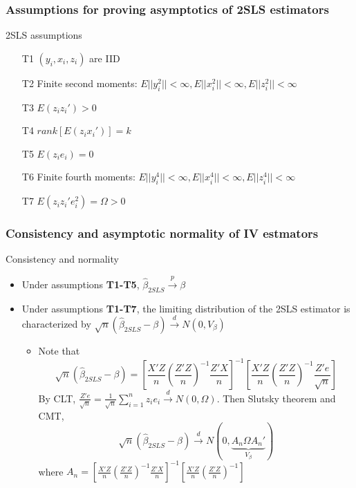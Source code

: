 \documentclass[aspectratio=169]{beamer}
\begin{document}
\begin{frame}
\frametitle{Assumptions for proving asymptotics of 2SLS estimators}
\begin{block}{2SLS assumptions}
\begin{itemize}
\item[T1] $(y_i, x_i, z_i)$ are IID
\item[T2] Finite second moments: $E||y_i^2||<\infty, E||x_i^2||<\infty, E||z_i^2||<\infty$
\item[T3] $E(z_iz_i')>0$
\item[T4] $rank[E(z_ix_i')]=k$
\item[T5] $E(z_ie_i)=0$
\item[T6] Finite fourth moments: $E||y_i^4||<\infty, E||x_i^4||<\infty, E||z_i^4||<\infty$
\item[T7] $E(z_iz_i'e_i^2)=\Omega>0$
\end{itemize}
\end{block}
\end{frame}

\begin{frame}
\frametitle{Consistency and asymptotic normality of IV estmators}
\begin{block}{Consistency and normality}
\begin{itemize}
\item Under assumptions \textbf{T1-T5}, $\hat{\beta}_{2SLS}\xrightarrow{p}\beta$
\item  Under assumptions \textbf{T1-T7}, the limiting distribution of the 2SLS estimator is characterized by $\sqrt{n}(\hat{\beta}_{2SLS}-\beta)\xrightarrow{d}N(0,V_\beta)$
\begin{itemize}
\item Note that
\footnotesize{\[
\sqrt{n}(\hat{\beta}_{2SLS}-\beta)=\left[\frac{X'Z}{n}\left(\frac{Z'Z}{n}\right)^{-1} \frac{Z'X}{n}\right]^{-1}\left[\frac{X'Z}{n}\left(\frac{Z'Z}{n}\right)^{-1} \frac{Z'e}{\sqrt{n}}\right]
\]}\normalsize
By CLT, $\frac{Z'e}{\sqrt{n}}=\frac{1}{\sqrt{n}}\sum_{i=1}^nz_ie_i\xrightarrow{d}N(0,\Omega)$. Then Slutsky theorem and CMT,
\footnotesize{\[
\sqrt{n}(\hat{\beta}_{2SLS}-\beta)\xrightarrow{d}N(0,\underbrace{A_n\Omega A_n'}_{V_\beta})
\]}\normalsize
where $A_n=\left[\frac{X'Z}{n}\left(\frac{Z'Z}{n}\right)^{-1} \frac{Z'X}{n}\right]^{-1}\left[ \frac{X'Z}{n}\left(\frac{Z'Z}{n}\right)^{-1}\right]$
\end{itemize}
\end{itemize}
\end{block}
\end{frame}
\end{document}
